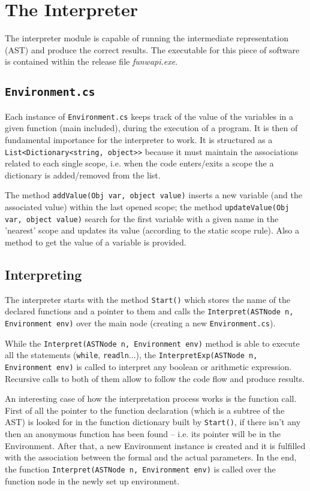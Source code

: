 \chapter{\label{chapter4} The \fwap Interpreter}

The interpreter module is capable of running the \fwap intermediate representation (AST) and produce the correct results. The executable for this piece of software is contained within the release file \textit{funwapi.exe}. 

\section{\texttt{Environment.cs}}

Each instance of \texttt{Environment.cs} keeps track of the value of the variables in a given function (main included), during the execution of a program. It is then of fundamental importance for the interpreter to work. It is structured as a \texttt{List<Dictionary<string, object>>} because it must maintain the associations related to each single scope, i.e. when the code enters/exits a scope the a dictionary is added/removed from the list.

The method \texttt{addValue(Obj var, object value)} inserts a new variable (and the associated value) within the last opened scope; the method \texttt{updateValue(Obj var, object value)} search for the first variable with a given name in the 'nearest' scope and updates its value (according to the static scope rule). Also a method to get the value of a variable is provided.

\section{Interpreting \fwap}

The interpreter starts with the method \texttt{Start()} which stores the name of the declared functions and a pointer to them and calls the \texttt{Interpret(ASTNode n, Environment env)} over the main node (creating a new \texttt{Environment.cs}). 

While the \texttt{Interpret(ASTNode n, Environment env)} method is able to execute all the statements (\texttt{while}, \texttt{readln}...), the \texttt{InterpretExp(ASTNode n, Environment env)} is called to interpret any boolean or arithmetic expression. Recursive calls to both of them allow to follow the code flow and produce results.

An interesting case of how the interpretation process works is the function call. First of all the pointer to the function declaration (which is a subtree of the AST) is looked for in the function dictionary built by \texttt{Start()}, if there isn't any then an anonymous function has been found -- i.e. its pointer will be in the Environment. After that, a new Environment instance is created and it is fulfilled with the association between the formal and the actual parameters. In the end, the function \texttt{Interpret(ASTNode n, Environment env)} is called over the function node in the newly set up environment.

